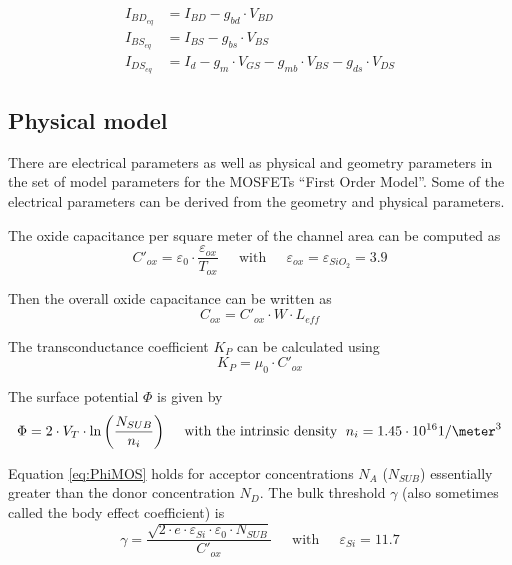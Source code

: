 \documentclass[10pt]{report}
\begin{document}
\begin{align}
I_{BD_{eq}} &= I_{BD} - g_{bd} \cdot V_{BD}\\
I_{BS_{eq}} &= I_{BS} - g_{bs} \cdot V_{BS}\\
I_{DS_{eq}} &= I_{d} - g_{m} \cdot V_{GS} - g_{mb} \cdot V_{BS} - g_{ds}\cdot V_{DS}
\end{align}

\subsection{Physical model}

There are electrical parameters as well as physical and geometry
parameters in the set of model parameters for the MOSFETs ``First
Order Model''.  Some of the electrical parameters can be derived from
the geometry and physical parameters.

\addvspace{12pt}

The oxide capacitance per square meter of the channel area can be
computed as
\begin{equation}
C'_{ox} = \varepsilon_0\cdot\dfrac{\varepsilon_{ox}}{T_{ox}}
\;\;\;\; \textrm{ with } \;\;\;\;
\varepsilon_{ox} = \varepsilon_{SiO_2} = 3.9
\end{equation}

Then the overall oxide capacitance can be written as
\begin{equation}
C_{ox} = C'_{ox}\cdot W \cdot L_{eff}
\end{equation}

The transconductance coefficient $K_P$ can be calculated using
\begin{equation}
K_P = \mu_0\cdot C'_{ox}
\end{equation}

The surface potential $\Phi$ is given by
\begin{equation}
\Phi = 2\cdot V_T\cdot \ln{\left(\dfrac{N_{SUB}}{n_i}\right)}
\;\;\;\; \textrm{ with the intrinsic density } \;
n_i = 1.45\cdot 10^{16} 1/\meter^3
\label{eq:PhiMOS}
\end{equation}

Equation \eqref{eq:PhiMOS} holds for acceptor concentrations $N_A$
($N_{SUB}$) essentially greater than the donor concentration $N_D$.
The bulk threshold $\gamma$ (also sometimes called the body effect
coefficient) is
\begin{equation}
\gamma = \dfrac{\sqrt{2\cdot e\cdot \varepsilon_{Si}\cdot \varepsilon_{0}\cdot N_{SUB}}}{C'_{ox}}
\;\;\;\; \textrm{ with } \;\;\;\;
\varepsilon_{Si} = 11.7
\end{equation}
\end{document}
